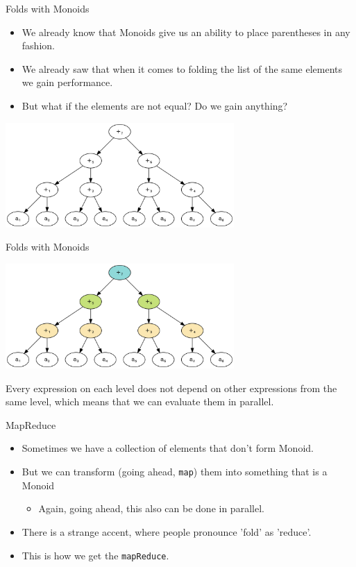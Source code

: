 \documentclass[presentation,aspectratio=169,smaller]{beamer}
\begin{document}
\begin{frame}[label={sec:org194ef80}]{Folds with Monoids}
\begin{itemize}
\item We already know that Monoids give us an ability to place parentheses in any
fashion.
\item We already saw that when it comes to folding the list of the same elements we
gain performance.
\item But what if the elements are not equal? Do we gain anything?
\end{itemize}

\pause
\begin{center}
\includegraphics[height=4cm]{.dot/fold-parallel-1.png}
\end{center}
\end{frame}

\begin{frame}[label={sec:org75aaea8}]{Folds with Monoids}
\begin{center}
\includegraphics[height=4cm]{.dot/fold-parallel-2.png}
\end{center}

Every expression on each level does not depend on other expressions from the
same level, which means that we can evaluate them in parallel.
\end{frame}

\begin{frame}[label={sec:orgeed2d06},fragile]{MapReduce}
 \begin{itemize}
\item Sometimes we have a collection of elements that don't form Monoid.
\item But we can transform (going ahead, \texttt{map}) them into something that is a Monoid
\begin{itemize}
\item Again, going ahead, this also can be done in parallel.
\end{itemize}
\item There is a strange accent, where people pronounce 'fold' as 'reduce'.
\item This is how we get the \texttt{mapReduce}.
\end{itemize}
\end{frame}
\end{document}
